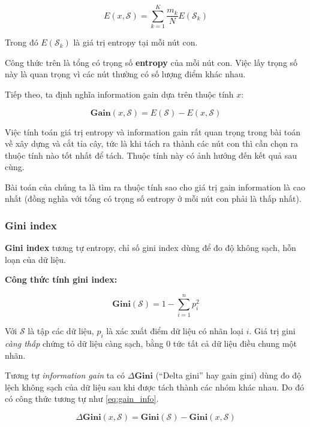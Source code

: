\documentclass[../main-report.tex]{subfiles}
\begin{document}
\begin{equation}
E(x, \mathcal{S}) = \sum_{k=1}^K \frac{m_k}{N} E(\mathcal{S}_k)
\end{equation}

Trong đó $E(\mathcal{S}_k)$ là giá trị entropy tại mỗi nút con.

Công thức trên là tổng có trọng số \textbf{entropy} của mỗi nút con. Việc lấy trọng số này là quan trọng vì các nút thường có số lượng điểm khác nhau.

Tiếp theo, ta định nghĩa information gain dựa trên thuộc tính \(x\):

\begin{equation} \label{eq:gain_info}
\mathbf{Gain}(x, \mathcal{S}) = E(\mathcal{S}) - E(x, \mathcal{S})
\end{equation}

Việc tính toán giá trị entropy và information gain rất quan trọng trong bài toán về xây dựng và cắt tỉa cây, tức là khi tách ra thành các nút con thì cần chọn ra thuộc tính nào tốt nhất để tách. Thuộc tính này có ảnh hướng đến kết quả sau cùng.

Bài toán của chúng ta là tìm ra thuộc tính sao cho giá trị gain information là cao nhất (đồng nghĩa với tổng có trọng số entropy ở mỗi nút con phải là thấp nhất).

\subsubsection{Gini index}
\textbf{Gini index} tương tự entropy, chỉ số gini index dùng để đo độ không sạch, hỗn loạn của dữ liệu.

\textbf{Công thức tính gini index:}

\begin{equation}
\mathbf{Gini}(\mathcal{S}) = 1 - \sum_{i=1}^n p^{2}_{i}
\end{equation}

Với $\mathcal{S}$ là  tập các dữ liệu, $p_i$ là xác xuất điểm dữ liệu có nhãn loại $i$. Giá trị gini \emph{càng thấp} chứng tỏ dữ liệu càng sạch, bằng 0 tức tất cả dữ liệu điều chung một nhãn.

Tương tự \emph{information gain} ta có $\Delta\mathbf{Gini}$ (``Delta gini'' hay gain gini) dùng đo độ lệch không sạch của dữ liệu sau khi được tách thành các nhóm khác nhau. Do đó có công thức tương tự như \ref{eq:gain_info}.

\begin{equation}
\Delta\mathbf{Gini}(x, \mathcal{S}) = \mathbf{Gini}(\mathcal{S}) - \mathbf{Gini}(x, \mathcal{S})
\end{equation}
\end{document}
